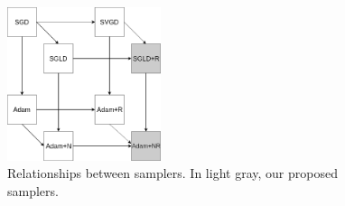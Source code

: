 \begin{figure}[!h]
    \centering
\includegraphics[width=0.4\textwidth]{img/sgmcmc}
    \caption{Relationships between samplers. In light gray, our proposed samplers.}\label{fig:diagram}
\end{figure}






